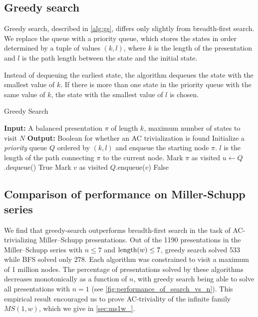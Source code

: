 \subsection{Greedy search}\label{ss:greedy_search}

Greedy search, described in \cref{alg:gs}, differs only slightly from breadth-first search. We replace the queue with a priority queue, which stores the states in order determined by a tuple of values $(k, l)$, where $k$ is the length of the presentation and $l$ is the path length between the state and the initial state.

Instead of dequeuing the earliest state, the algorithm dequeues the state with the smallest value of $k$. If there is more than one state in the priority queue with the same value of $k$, the state with the smallest value of $l$ is chosen.

\begin{algorithm}
	\caption{Greedy Search}\label{alg:gs}
	\begin{algorithmic}[1] %
		\State \textbf{Input:} A balanced presentation $\pi$ of length $k$, maximum number of states to visit $N$
		\State \textbf{Output:} Boolean for whether an AC trivialization is found
		\State Initialize a \textit{priority} queue $Q$ ordered by $(k, l)$ and enqueue the starting node $\pi$.
		$l$ is the length of the path connecting $\pi$ to the current node.
		\State Mark $\pi$ as visited
		\State $u \gets Q$.dequeue() 
		\State \Return True 
		\EndIf
		\State Mark $v$ as visited
		\State $Q$.enqueue($v$) 
		\EndIf
		\EndFor
		\EndWhile
		\State \Return False 
	\end{algorithmic}
\end{algorithm}

\subsection{Comparison of performance on Miller-Schupp series}\label{sec:search-ms}

We find that greedy-search outperforms breadth-first search in the task of AC-trivializing Miller--Schupp presentations. %
Out of the 1190 presentations in the Miller--Schupp series with $n \leq 7$ and $\operatorname{length}(w) \leq 7$, greedy search solved 533 while BFS solved only 278.
Each algorithm was constrained to visit a maximum of 1 million nodes.
The percentage of presentations solved by these algorithms decreases monotonically as a function of $n$, with greedy search being able to solve all presentations with $n=1$ (see \cref{fig:performance_of_search_vs_n}).
This empirical result encouraged us to prove AC-triviality of the infinite family $MS(1, w)$, which we give in \cref{sec:ms1w_}.

